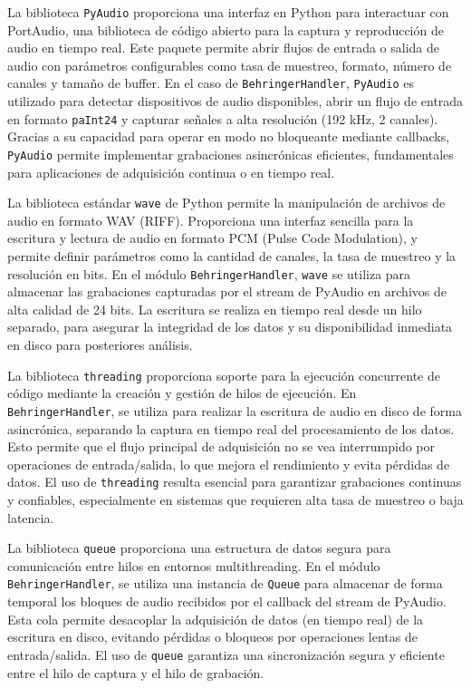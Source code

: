 La biblioteca \texttt{PyAudio} proporciona una interfaz en Python para interactuar con PortAudio, una biblioteca de código abierto para la captura y reproducción de audio en tiempo real. Este paquete permite abrir flujos de entrada o salida de audio con parámetros configurables como tasa de muestreo, formato, número de canales y tamaño de buffer. En el caso de \texttt{BehringerHandler}, \texttt{PyAudio} es utilizado para detectar dispositivos de audio disponibles, abrir un flujo de entrada en formato \texttt{paInt24} y capturar señales a alta resolución (192 kHz, 2 canales). Gracias a su capacidad para operar en modo no bloqueante mediante callbacks, \texttt{PyAudio} permite implementar grabaciones asincrónicas eficientes, fundamentales para aplicaciones de adquisición continua o en tiempo real.

La biblioteca estándar \texttt{wave} de Python permite la manipulación de archivos de audio en formato WAV (RIFF). Proporciona una interfaz sencilla para la escritura y lectura de audio en formato PCM (Pulse Code Modulation), y permite definir parámetros como la cantidad de canales, la tasa de muestreo y la resolución en bits. En el módulo \texttt{BehringerHandler}, \texttt{wave} se utiliza para almacenar las grabaciones capturadas por el stream de PyAudio en archivos de alta calidad de 24 bits. La escritura se realiza en tiempo real desde un hilo separado, para asegurar la integridad de los datos y su disponibilidad inmediata en disco para posteriores análisis.

La biblioteca \texttt{threading} proporciona soporte para la ejecución concurrente de código mediante la creación y gestión de hilos de ejecución. En \texttt{BehringerHandler}, se utiliza para realizar la escritura de audio en disco de forma asincrónica, separando la captura en tiempo real del procesamiento de los datos. Esto permite que el flujo principal de adquisición no se vea interrumpido por operaciones de entrada/salida, lo que mejora el rendimiento y evita pérdidas de datos. El uso de \texttt{threading} resulta esencial para garantizar grabaciones continuas y confiables, especialmente en sistemas que requieren alta tasa de muestreo o baja latencia.

La biblioteca \texttt{queue} proporciona una estructura de datos segura para comunicación entre hilos en entornos multithreading. En el módulo \texttt{BehringerHandler}, se utiliza una instancia de \texttt{Queue} para almacenar de forma temporal los bloques de audio recibidos por el callback del stream de PyAudio. Esta cola permite desacoplar la adquisición de datos (en tiempo real) de la escritura en disco, evitando pérdidas o bloqueos por operaciones lentas de entrada/salida. El uso de \texttt{queue} garantiza una sincronización segura y eficiente entre el hilo de captura y el hilo de grabación.

